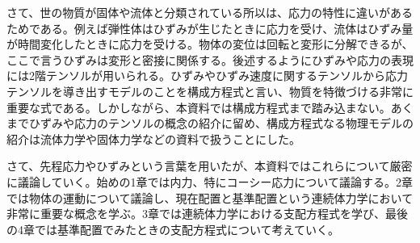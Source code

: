 \documentclass[dvipdfmx, 9pt, a4paper]{jsarticle}
\numberwithin{equation}{section}
\begin{document}
さて、世の物質が固体や流体と分類されている所以は、応力の特性に違いがあるためである。例えば弾性体はひずみが生じたときに応力を受け、流体はひずみ量が時間変化したときに応力を受ける。物体の変位は回転と変形に分解できるが、ここで言うひずみは変形と密接に関係する。後述するようにひずみや応力の表現には2階テンソルが用いられる。ひずみやひずみ速度に関するテンソルから応力テンソルを導き出すモデルのことを構成方程式と言い、物質を特徴づける非常に重要な式である。しかしながら、本資料では構成方程式まで踏み込まない。あくまでひずみや応力のテンソルの概念の紹介に留め、構成方程式なる物理モデルの紹介は流体力学や固体力学などの資料で扱うことにした。\par
さて、先程応力やひずみという言葉を用いたが、本資料ではこれらについて厳密に議論していく。始めの1章では内力、特にコーシー応力について議論する。2章では物体の運動について議論し、現在配置と基準配置という連続体力学において非常に重要な概念を学ぶ。3章では連続体力学における支配方程式を学び、最後の4章では基準配置でみたときの支配方程式について考えていく。
\end{document}
